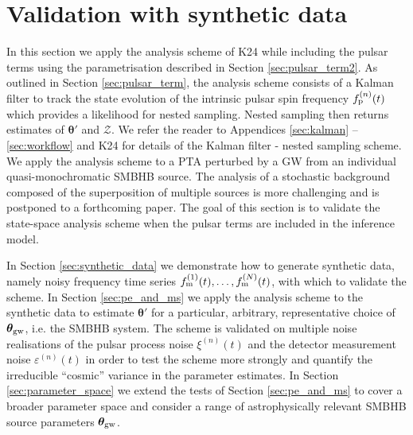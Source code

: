 \documentclass[fleqn,usenatbib,useAMS]{mnras}
\begin{document}
\section{Validation with synthetic data}\label{sec:rep_example1}
In this section we apply the analysis scheme of K24 while including the pulsar terms using the parametrisation described in Section \ref{sec:pulsar_term2}. As outlined in Section \ref{sec:pulsar_term}, the analysis scheme consists of a Kalman filter to track the state evolution of the intrinsic pulsar spin frequency $f_{\rm p}^{(n)}(t)$ which provides a likelihood for nested sampling. Nested sampling then returns estimates of $\boldsymbol{\theta'}$ and $\mathcal{Z}$. We refer the reader to Appendices \ref{sec:kalman} -- \ref{sec:workflow} and K24 for details of the Kalman filter - nested sampling scheme. We apply the analysis scheme to a PTA perturbed by a GW from an individual quasi-monochromatic SMBHB source. The analysis of a stochastic background composed of the superposition of multiple sources is more challenging and is postponed to a forthcoming paper. The goal of this section is to validate the state-space analysis scheme when the pulsar terms are included in the inference model. \newline 

In Section \ref{sec:synthetic_data} we demonstrate how to generate synthetic data, namely noisy frequency time series $f_{\rm m}^{(1)}(t), \dots, f_{\rm m}^{(N)}(t)$, with which to validate the scheme. In Section \ref{sec:pe_and_ms} we apply the analysis scheme to the synthetic data to estimate $\boldsymbol{\theta'}$ for a  particular, arbitrary, representative choice of $\boldsymbol{\theta}_{\rm gw}$, i.e. the SMBHB system. The scheme is validated on multiple noise realisations of the pulsar process noise $\xi^{(n)}(t)$ and the detector measurement noise $\varepsilon^{(n)}(t)$ in order to test the scheme more strongly and quantify the  irreducible ``cosmic'' variance in the parameter estimates. In Section \ref{sec:parameter_space} we extend the tests of Section  \ref{sec:pe_and_ms}
to cover a broader parameter space and consider a range of astrophysically relevant SMBHB source parameters $\boldsymbol{\theta}_{\rm gw}$. 
\end{document}

